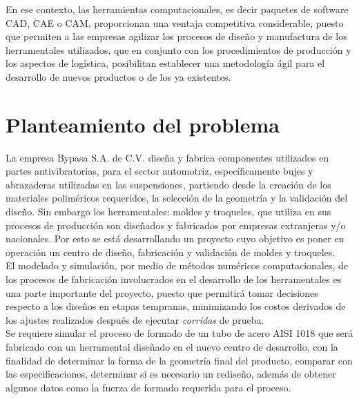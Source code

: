 En ese contexto, las herramientas computacionales, es decir paquetes de software CAD, CAE o CAM, 
proporcionan una ventaja competitiva considerable, puesto que permiten a las empresas agilizar 
los procesos de diseño y manufactura de los herramentales utilizados, que 
en conjunto con los procedimientos de producción y los aspectos de logística, posibilitan  
establecer una metodología ágil para el desarrollo de nuevos productos o de los ya existentes.





\section{Planteamiento del problema}

La empresa Bypasa S.A. de C.V. diseña y fabrica componentes utilizados en partes antivibratorias, 
para el sector automotriz, específicamente bujes y abrazaderas utilizadas en las suspensiones, 
partiendo desde la creación de los materiales poliméricos requeridos, la selección de la geometría 
y la validación del diseño. Sin embargo los herramentales: moldes y troqueles, que utiliza en sus 
procesos de producción son diseñados y fabricados por empresas extranjeras y/o nacionales. Por esto 
se está desarrollando un proyecto cuyo objetivo es poner en operación un centro de diseño, fabricación 
y validación de moldes y troqueles.\\

El modelado y simulación, por medio de métodos numéricos computacionales, de los procesos de fabricación 
involucrados en el desarrollo de los herramentales es una parte importante del proyecto, puesto que 
permitirá tomar decisiones respecto a los diseños en etapas tempranas, minimizando los costos derivados de 
los ajustes realizados después de ejecutar \textit{corridas} de prueba.\\

Se requiere simular el proceso de formado de un tubo de acero AISI 1018 que será fabricado con 
un herramental diseñado en el nuevo centro de desarrollo, con la finalidad de determinar 
la forma de la geometría final del producto, comparar con las especificaciones, determinar 
si es necesario un rediseño, además de obtener algunos datos como la fuerza de formado 
requerida para el proceso. 

